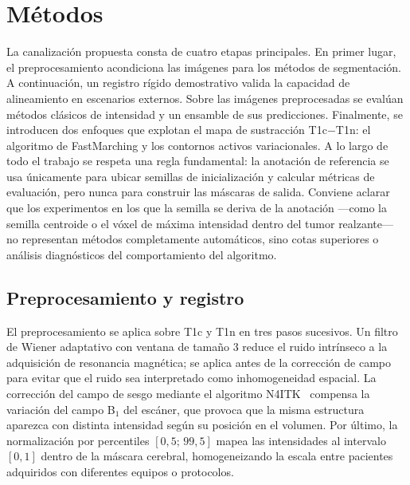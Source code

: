 \documentclass[conference]{IEEEtran}
\begin{document}
\section{M\'{e}todos}

La canalizaci\'{o}n propuesta consta de cuatro etapas principales.
En primer lugar, el preprocesamiento acondiciona las im\'{a}genes
para los m\'{e}todos de segmentaci\'{o}n.
A continuaci\'{o}n, un registro r\'{i}gido demostrativo valida la
capacidad de alineamiento en escenarios externos.
Sobre las im\'{a}genes preprocesadas se eval\'{u}an m\'{e}todos
cl\'{a}sicos de intensidad y un ensamble de sus predicciones.
Finalmente, se introducen dos enfoques que explotan el mapa de
sustracci\'{o}n T1c$-$T1n: el algoritmo de FastMarching y los
contornos activos variacionales.
A lo largo de todo el trabajo se respeta una regla fundamental:
la anotaci\'{o}n de referencia se usa \'{u}nicamente para ubicar
semillas de inicializaci\'{o}n y calcular m\'{e}tricas de
evaluaci\'{o}n, pero nunca para construir las m\'{a}scaras de salida.
Conviene aclarar que los experimentos en los que la semilla se
deriva de la anotaci\'{o}n ---como la semilla centroide o el
v\'{o}xel de m\'{a}xima intensidad dentro del tumor realzante--- no
representan m\'{e}todos completamente autom\'{a}ticos, sino cotas
superiores o an\'{a}lisis diagn\'{o}sticos del comportamiento del
algoritmo.

\subsection{Preprocesamiento y registro}

El preprocesamiento se aplica sobre T1c y T1n en tres pasos
sucesivos.
Un filtro de Wiener adaptativo con ventana de tama\~{n}o 3 reduce el
ruido intr\'{i}nseco a la adquisici\'{o}n de resonancia
magn\'{e}tica; se aplica antes de la correcci\'{o}n de campo para
evitar que el ruido sea interpretado como inhomogeneidad espacial.
La correcci\'{o}n del campo de sesgo mediante el algoritmo
N4ITK~\cite{tustison2010n4} compensa la variaci\'{o}n del campo
B$_1$ del esc\'{a}ner, que provoca que la misma estructura aparezca
con distinta intensidad seg\'{u}n su posici\'{o}n en el volumen.
Por \'{u}ltimo, la normalizaci\'{o}n por percentiles
$[0{,}5;\,99{,}5]$ mapea las intensidades al intervalo $[0,1]$
dentro de la m\'{a}scara cerebral, homogeneizando la escala entre
pacientes adquiridos con diferentes equipos o protocolos.
\end{document}
